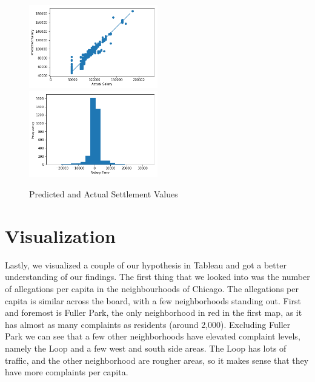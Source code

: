 \documentclass[11pt]{article}
\begin{document}
\begin{figure}[h]
\caption{Predicted and Actual Settlement Values}
\includegraphics[width=0.5\textwidth]{pred.png}
\includegraphics[width=0.5\textwidth]{error.png}
\end{figure}

\FloatBarrier
\section{Visualization}

Lastly, we visualized a couple of our hypothesis in Tableau and got a better understanding of our findings. The first thing that we looked into was the number of allegations per capita in the neighbourhoods of Chicago. The allegations per capita is similar across the board, with a few neighborhoods standing out. First and foremost is Fuller Park, the only neighborhood in red in the first map, as it has almost as many complaints as residents (around 2,000). Excluding Fuller Park we can see that a few other neighborhoods have elevated complaint levels, namely the Loop and a few west and south side areas. The Loop has lots of traffic, and the other neighborhood are rougher areas, so it makes sense that they have more complaints per capita.
\end{document}
